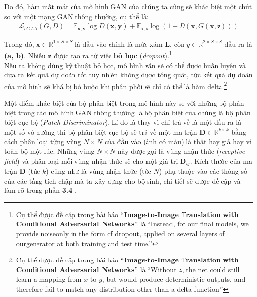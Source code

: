 \documentclass[a4paper]{article}
\begin{document}
\noindent
Do đó, hàm mất mát của mô hình GAN của chúng ta cũng sẽ khác biệt một chút so với một mạng GAN thông thường, cụ thể là:
\begin{align*}
    \mathcal{L}_{cGAN}(G, D) = \mathbb{E}_{\mathbf{x}, \mathbf{y}}\log D\left(\mathbf{x}, \mathbf{y}\right) + \mathbb{E}_{\mathbf{x}, \mathbf{z}}\log \left(1 - D\left(\mathbf{x}, G\left(\mathbf{x}, \mathbf{z}\right)\right)\right)
\end{align*}

\noindent
Trong đó, $\mathbf{x} \in \mathbb{R}^{1\times S \times S}$ là đầu vào chính là mức xám \textbf{L}, còn $y \in \mathbb{R}^{2\times S \times S}$ đầu ra là \textbf{(a, b)}. Nhiễu $\mathbf{z}$ được tạo ra từ việc \textbf{bỏ học} (\textit{dropout}).\footnote{Cụ thể được đề cập trong bài báo ``\textbf{Image-to-Image Translation with Conditional Adversarial Networks}'' là ``Instead, for our final models, we provide noiseonly in the form of dropout, applied on several layers of ourgenerator at both training and test time.''}\\
Nếu ta không dùng kỹ thuật bỏ học, mô hình vẫn sẽ có thể được huấn luyện và đưa ra kết quả dự đoán tốt tuy nhiên không được tổng quát, tức kết quả dự đoán của mô hình sẽ khá bị bó buộc khi phân phối sẽ chỉ có thể là hàm delta.\footnote{Cụ thể được đề cập trong bài báo ``\textbf{Image-to-Image Translation with Conditional Adversarial Networks}'' là ``Without $z$, the net could still learn a mapping from $x$ to $y$, but would produce deterministic outputs, and therefore fail to match any distribution other than a delta function.''}

\noindent
Một điểm khác biệt của bộ phân biệt trong mô hình này so với những bộ phân biệt trong các mô hình GAN thông thường là bộ phân biệt của chúng là bộ phân biệt cục bộ (\textit{Patch Discriminator}). Lí do là thay vì chỉ trả về là một đầu ra là một số vô hướng thì bộ phân biệt cục bộ sẽ trả về một ma trận $\mathbf{D} \in \mathbb{R}^{k\times k}$ bằng cách phân loại từng vùng $N \times N$ của đầu vào (ảnh có màu) là thật hay giả hay vì toàn bộ một lúc. Những vùng $N \times N$ này được gọi là vùng nhận thức (\textit{receptive field}) và phân loại mỗi vùng nhận thức sẽ cho một giá trị $\mathbf{D}_{ij}$. Kích thước của ma trận $\mathbf{D}$ (tức $k$) cũng như là vùng nhận thức (tức $N$) phụ thuộc vào các thông số của các tầng tích chập mà ta xây dựng cho bộ sinh, chi tiết sẽ được đề cập và làm rõ trong phần \textbf{3.4 }.\\
\end{document}

